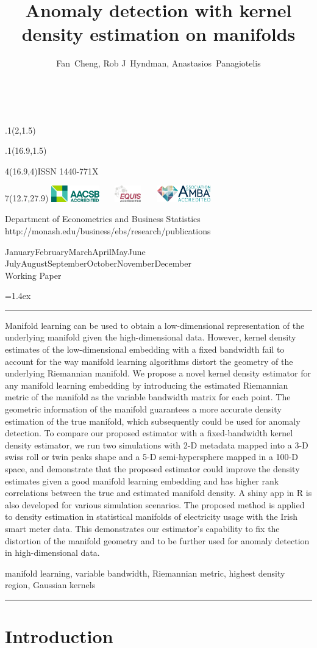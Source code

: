 \documentclass[11pt,a4paper,]{article}
\title{Anomaly detection with kernel density estimation on manifolds}
\author{Fan~Cheng, Rob J~Hyndman, Anastasios~Panagiotelis}
\date{\sf\Date~\Month~\Year}
\makeatletter
\def\Date{\number\day}
\def\Month{\ifcase\month\or
 January\or February\or March\or April\or May\or June\or
 July\or August\or September\or October\or November\or December\fi}
\def\Year{\number\year}
\def\showjel{{\large\textsf{\textbf{JEL classification:}}~\@jel}}
\def\cover{{\sffamily\setcounter{page}{0}
        \thispagestyle{empty}
        \placefig{2}{1.5}{width=5cm}{monash2}
        \placefig{16.9}{1.5}{width=2.1cm}{MBusSchool}
        \begin{textblock}{4}(16.9,4)ISSN 1440-771X\end{textblock}
        \begin{textblock}{7}(12.7,27.9)\hfill
        \includegraphics[height=0.7cm]{AACSB}~~~
        \includegraphics[height=0.7cm]{EQUIS}~~~
        \includegraphics[height=0.7cm]{AMBA}
        \end{textblock}
        \vspace*{2cm}
        \begin{center}\Large
        Department of Econometrics and Business Statistics\\[.5cm]
        \footnotesize http://monash.edu/business/ebs/research/publications
        \end{center}\vspace{2cm}
        \begin{center}
        \fbox{\parbox{14cm}{\begin{onehalfspace}\centering\Huge\vspace*{0.3cm}
                \textsf{\textbf{\expandafter{\@title}}}\vspace{1cm}\par
                \LARGE\@author\end{onehalfspace}
        }}
        \end{center}
        \vfill
                \begin{center}\Large
                \Month~\Year\\[1cm]
                Working Paper \@wp
        \end{center}\vspace*{2cm}}}
\def\pageone{{\sffamily\setstretch{1}%
        \thispagestyle{empty}%
        \vbox to \textheight{%
        \raggedright\baselineskip=1.2cm
     {\fontsize{24.88}{30}\sffamily\textbf{\expandafter{\@title}}}
        \vspace{2cm}\par
        \hspace{1cm}\parbox{14cm}{\sffamily\large\@addresses}\vspace{1cm}\vfill
        \hspace{1cm}{\large\Date~\Month~\Year}\\[1cm]
        \hspace{1cm}\showjel\vss}}}
\def\blindtitle{{\sffamily
     \thispagestyle{plain}\raggedright\baselineskip=1.2cm
     {\fontsize{24.88}{30}\sffamily\textbf{\expandafter{\@title}}}\vspace{1cm}\par
        }}
\def\titlepage{{\cover\newpage\pageone\newpage\blindtitle}}
\let\maketitle\titlepage
\newenvironment{keywords}{\par\vspace{0.5cm}\noindent{\sffamily\textbf{Keywords:}}}{\vspace{0.25cm}\par\hrule\vspace{0.5cm}\par}
\renewenvironment{abstract}{\begin{minipage}{\textwidth}\parskip=1.4ex\noindent
\hrule\vspace{0.1cm}\par{\sffamily\textbf{\abstractname}}\newline}
  {\end{minipage}}
\def\placefig#1#2#3#4{\begin{textblock}{.1}(#1,#2)\rlap{\texttt{[image: \#4]}}\end{textblock}}
\makeatother
\begin{document}
\maketitle
\begin{abstract}
Manifold learning can be used to obtain a low-dimensional representation of the underlying manifold given the high-dimensional data. However, kernel density estimates of the low-dimensional embedding with a fixed bandwidth fail to account for the way manifold learning algorithms distort the geometry of the underlying Riemannian manifold. We propose a novel kernel density estimator for any manifold learning embedding by introducing the estimated Riemannian metric of the manifold as the variable bandwidth matrix for each point. The geometric information of the manifold guarantees a more accurate density estimation of the true manifold, which subsequently could be used for anomaly detection. To compare our proposed estimator with a fixed-bandwidth kernel density estimator, we run two simulations with 2-D metadata mapped into a 3-D swiss roll or twin peaks shape and a 5-D semi-hypersphere mapped in a 100-D space, and demonstrate that the proposed estimator could improve the density estimates given a good manifold learning embedding and has higher rank correlations between the true and estimated manifold density. A shiny app in R is also developed for various simulation scenarios. The proposed method is applied to density estimation in statistical manifolds of electricity usage with the Irish smart meter data. This demonstrates our estimator's capability to fix the distortion of the manifold geometry and to be further used for anomaly detection in high-dimensional data.
\end{abstract}
\begin{keywords}
manifold learning, variable bandwidth, Riemannian metric, highest density region, Gaussian kernels
\end{keywords}

\newpage

\hypertarget{introduction}{%
\section{Introduction}\label{introduction}}
\end{document}
